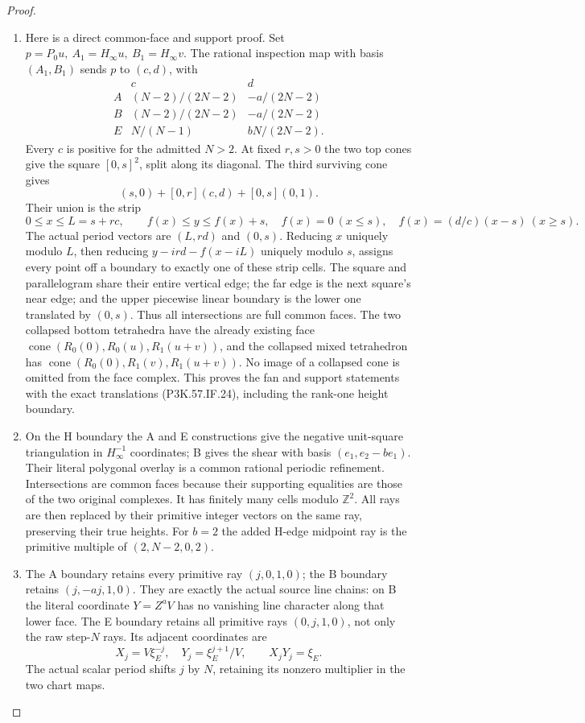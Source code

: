\begin{proof}
\begin{enumerate}[label=\arabic*.]
\item Here is a direct common-face and support proof. Set
\(p=P_0u,\ A_1=H_\infty u,\ B_1=H_\infty v\).
The rational inspection map with basis \((A_1,B_1)\) sends \(p\) to
\((c,d)\), with
\[
 \begin{array}{c|cc}
 &c&d\\ \hline
 A&(N-2)/(2N-2)&-a/(2N-2)\\
 B&(N-2)/(2N-2)&-a/(2N-2)\\
 E&N/(N-1)&bN/(2N-2).
 \end{array}                                           \tag{P3K.57.IF.25}
\]
Every \(c\) is positive for the admitted \(N>2\). At fixed \(r,s>0\)
the two top cones give the square \([0,s]^2\), split along its
diagonal. The third surviving cone gives
\[
          (s,0)+[0,r](c,d)+[0,s](0,1).
\]
Their union is the strip
\[
 0\le x\le L=s+rc,\qquad f(x)\le y\le f(x)+s,\quad
 f(x)=0\ (x\le s),\quad f(x)=(d/c)(x-s)\ (x\ge s).
\]
The actual period vectors are \((L,rd)\) and \((0,s)\).
Reducing \(x\) uniquely modulo \(L\), then reducing
\(y-i rd-f(x-iL)\) uniquely modulo \(s\), assigns every point
off a boundary to exactly one of these strip cells.
The square and parallelogram share their entire vertical edge;
the far edge is the next square's near edge; and the upper
piecewise linear boundary is the lower one translated by \((0,s)\).
Thus all intersections are full common faces. The two collapsed
bottom tetrahedra have the already existing face
\(\operatorname{cone}(R_0(0),R_0(u),R_1(u+v))\), and the collapsed
mixed tetrahedron has
\(\operatorname{cone}(R_0(0),R_1(v),R_1(u+v))\).
No image of a collapsed cone is omitted from the face complex.
This proves the fan and support statements with the exact translations
(P3K.57.IF.24), including the rank-one height boundary.

\item On the H boundary the A and E constructions give the negative
unit-square triangulation in \(H_\infty^{-1}\) coordinates; B gives
the shear with basis \((e_1,e_2-be_1)\). Their literal polygonal
overlay is a common rational periodic refinement. Intersections
are common faces because their supporting equalities are those of
the two original complexes. It has finitely many cells modulo
\(\mathbb Z^2\). All rays are then replaced by their primitive
integer vectors on the same ray, preserving their true heights.
For \(b=2\) the added H-edge midpoint ray is the primitive multiple
of \((2,N-2,0,2)\).

\item The A boundary retains every primitive ray \((j,0,1,0)\); the B
boundary retains \((j,-aj,1,0)\). They are exactly the actual source
line chains: on B the literal coordinate \(Y=Z^aV\) has no vanishing
line character along that lower face. The E boundary retains all
primitive rays \((0,j,1,0)\), not only the raw step-\(N\) rays.
Its adjacent coordinates are
\[
       X_j=V\xi_E^{-j},\quad Y_j=\xi_E^{j+1}/V,\qquad
                       X_jY_j=\xi_E .                    \tag{P3K.57.IF.26}
\]
The actual scalar period shifts \(j\) by \(N\), retaining its
nonzero multiplier in the two chart maps.


\end{enumerate}
\end{proof}

